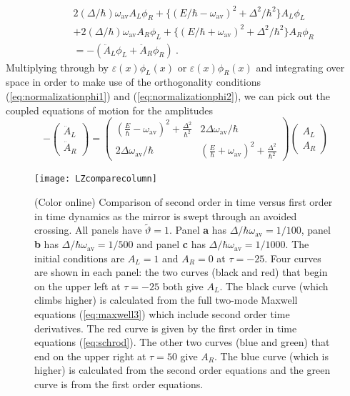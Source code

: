 \documentclass[twocolumn,english,pra,aps,superscriptaddress,floatfix]{revtex4-1}
\begin{document}
\begin{eqnarray}
&&  2 (\Delta/\hbar) \omega_{\mathrm{av}} A_{L} \phi_{R} + \{(E/\hbar-\omega_{\mathrm{av}})^2+\Delta^{2}/\hbar^2\} A_{L} \phi_{L} \nonumber \\
&& + 2 (\Delta/\hbar) \omega_{\mathrm{av}} A_{R} \phi_{L}+ \{(E/\hbar+\omega_{\mathrm{av}})^2+\Delta^{2}/\hbar^2\}A_{R} \phi_{R}   \nonumber \\
& & = - \left(\ddot{A}_{L} \phi_{L}+\ddot{A}_{R} \phi_{R} \right) \ .
\label{eq:maxwell2c}
\end{eqnarray}
Multiplying through by $\varepsilon(x) \phi_{L}(x)$ or $\varepsilon(x) \phi_{R}(x)$ and integrating over space in order to make use of the orthogonality conditions (\ref{eq:normalizationphi1}) and (\ref{eq:normalizationphi2}), we can pick out the coupled equations of motion for the amplitudes
\begin{equation}
-\left(\begin{array}{c}\ddot{A}_{L}  \\ \ddot{A}_{R}\end{array}\right)=\left(\begin{array}{cc} (\frac{E}{\hbar}-\omega_{\mathrm{av}})^2+\frac{\Delta^{2}}{\hbar^2} & 2 \Delta \omega_{\mathrm{av}}/\hbar \\ 2 \Delta \omega_{\mathrm{av}}/\hbar & (\frac{E}{\hbar}+\omega_{\mathrm{av}})^2+\frac{\Delta^{2}}{\hbar^2} \end{array}\right)\left(\begin{array}{c} A_{L}  \\ A_{R}\end{array}\right)
\label{eq:maxwell3}
\end{equation}

\begin{figure}
\texttt{[image: LZcomparecolumn]}
\caption{(Color online) Comparison of second order in time versus first order in time dynamics
 as the mirror is swept through an avoided crossing. All panels have $\tilde{\vartheta}=1$. Panel \textbf{a} has $\Delta / \hbar \omega_{\mathrm{av}}=1/100$, panel \textbf{b} has $\Delta / \hbar \omega_{\mathrm{av}}=1/500$ and panel \textbf{c} has $\Delta / \hbar \omega_{\mathrm{av}}=1/1000$. The initial conditions are $A_{L}=1$ and $A_{R}=0$ at $\tau=-25$. Four curves are shown in each panel: the two curves (black and red) that begin on the upper left at $\tau=-25$ both give $A_{L}$. The black curve (which climbs higher) is calculated from the full two-mode Maxwell equations (\ref{eq:maxwell3}) which include second order time derivatives. The red curve is given by the first order in time equations (\ref{eq:schrod}). The other two curves (blue and green) that end on the upper right at $\tau=50$ give $A_{R}$. The blue curve (which is higher) is calculated from the second order equations and the green curve is from the first order equations.}
\label{fig:LZcompare}
\end{figure}
\end{document}

